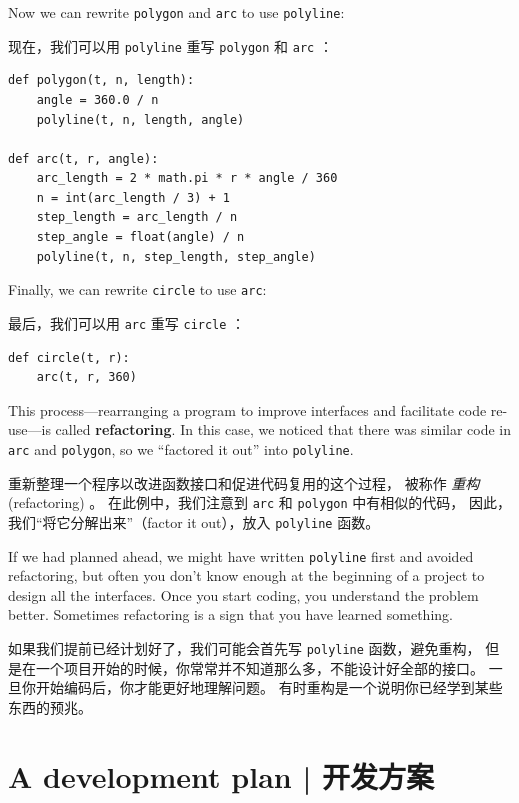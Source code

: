 %
Now we can rewrite {\tt polygon} and {\tt arc} to use {\tt polyline}:

现在，我们可以用 \lstinline{polyline} 重写 \lstinline{polygon} 和 \lstinline{arc} ：

\begin{lstlisting}
def polygon(t, n, length):
    angle = 360.0 / n
    polyline(t, n, length, angle)

def arc(t, r, angle):
    arc_length = 2 * math.pi * r * angle / 360
    n = int(arc_length / 3) + 1
    step_length = arc_length / n
    step_angle = float(angle) / n
    polyline(t, n, step_length, step_angle)
\end{lstlisting}

%
Finally, we can rewrite {\tt circle} to use {\tt arc}:

最后，我们可以用 \lstinline{arc} 重写 \lstinline{circle} ：

\begin{lstlisting}
def circle(t, r):
    arc(t, r, 360)
\end{lstlisting}

%
This process---rearranging a program to improve
interfaces and facilitate code re-use---is called {\bf refactoring}.
In this case, we noticed that there was similar code in {\tt arc} and
{\tt polygon}, so we ``factored it out'' into {\tt polyline}.

重新整理一个程序以改进函数接口和促进代码复用的这个过程，
被称作 \emph{重构} (refactoring) 。
在此例中，我们注意到 \lstinline{arc} 和 \lstinline{polygon} 中有相似的代码，
因此，我们“将它分解出来”（factor it out），放入 \lstinline{polyline} 函数。

If we had planned ahead, we might have written {\tt polyline} first
and avoided refactoring, but often you don't know enough at the
beginning of a project to design all the interfaces.  Once you start
coding, you understand the problem better.  Sometimes refactoring is a
sign that you have learned something.

如果我们提前已经计划好了，我们可能会首先写 \lstinline{polyline} 函数，避免重构，
但是在一个项目开始的时候，你常常并不知道那么多，不能设计好全部的接口。
一旦你开始编码后，你才能更好地理解问题。
有时重构是一个说明你已经学到某些东西的预兆。


\section{A development plan  |  开发方案}

